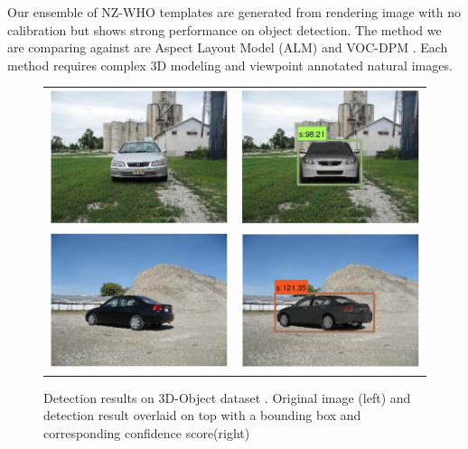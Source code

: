 \documentclass[10pt,twocolumn,letterpaper]{article}
\begin{document}
Our ensemble of NZ-WHO templates are generated from rendering image with no calibration but shows strong performance on object detection. The method we are comparing against are Aspect Layout Model (ALM) \cite{Xiang12} and VOC-DPM \cite{Pepik12}. Each method requires complex 3D modeling and viewpoint annotated natural images.
\begin{figure}[h]
    \begin{center}
    \setlength\tabcolsep{0pt}
\begin{tabular}{cc}
  \includegraphics[width=0.45\linewidth]{car_3dobject/7.png} &   
  \includegraphics[width=0.45\linewidth]{car_3dobject/8.png}\\ [-15pt]
  \includegraphics[width=0.45\linewidth]{car_3dobject/11.png} &   
  \includegraphics[width=0.45\linewidth]{car_3dobject/12.png}\\ [-5pt]
\end{tabular}
\end{center}
\caption{Detection results on 3D-Object dataset \cite{Savarese07}. Original image (left) and detection result overlaid on top with a bounding box and corresponding confidence score(right)}
  \label{fig:3dobject}
\end{figure}
\end{document}
